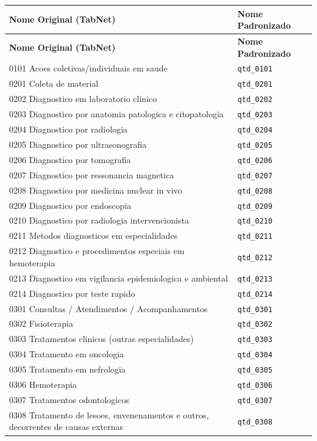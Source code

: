 \documentclass[12pt,a4paper]{report}
\begin{document}
\begin{longtable}{p{11.5cm} l}
\toprule
\textbf{Nome Original (TabNet)} & \textbf{Nome Padronizado} \\
\midrule
\endfirsthead
\toprule
\textbf{Nome Original (TabNet)} & \textbf{Nome Padronizado} \\
\midrule
\endhead
0101 Acoes coletivas/individuais em saude & \texttt{qtd\_0101} \\
0201 Coleta de material & \texttt{qtd\_0201} \\
0202 Diagnostico em laboratorio clinico & \texttt{qtd\_0202} \\
0203 Diagnostico por anatomia patologica e citopatologia & \texttt{qtd\_0203} \\
0204 Diagnostico por radiologia & \texttt{qtd\_0204} \\
0205 Diagnostico por ultrasonografia & \texttt{qtd\_0205} \\
0206 Diagnostico por tomografia & \texttt{qtd\_0206} \\
0207 Diagnostico por ressonancia magnetica & \texttt{qtd\_0207} \\
0208 Diagnostico por medicina nuclear in vivo & \texttt{qtd\_0208} \\
0209 Diagnostico por endoscopia & \texttt{qtd\_0209} \\
0210 Diagnostico por radiologia intervencionista & \texttt{qtd\_0210} \\
0211 Metodos diagnosticos em especialidades & \texttt{qtd\_0211} \\
0212 Diagnostico e procedimentos especiais em hemoterapia & \texttt{qtd\_0212} \\
0213 Diagnostico em vigilancia epidemiologica e ambiental & \texttt{qtd\_0213} \\
0214 Diagnostico por teste rapido & \texttt{qtd\_0214} \\
0301 Consultas / Atendimentos / Acompanhamentos & \texttt{qtd\_0301} \\
0302 Fisioterapia & \texttt{qtd\_0302} \\
0303 Tratamentos clinicos (outras especialidades) & \texttt{qtd\_0303} \\
0304 Tratamento em oncologia & \texttt{qtd\_0304} \\
0305 Tratamento em nefrologia & \texttt{qtd\_0305} \\
0306 Hemoterapia & \texttt{qtd\_0306} \\
0307 Tratamentos odontologicos & \texttt{qtd\_0307} \\
0308 Tratamento de lesoes, envenenamentos e outros, decorrentes de causas externas & \texttt{qtd\_0308} \\

\end{longtable}
\end{document}
